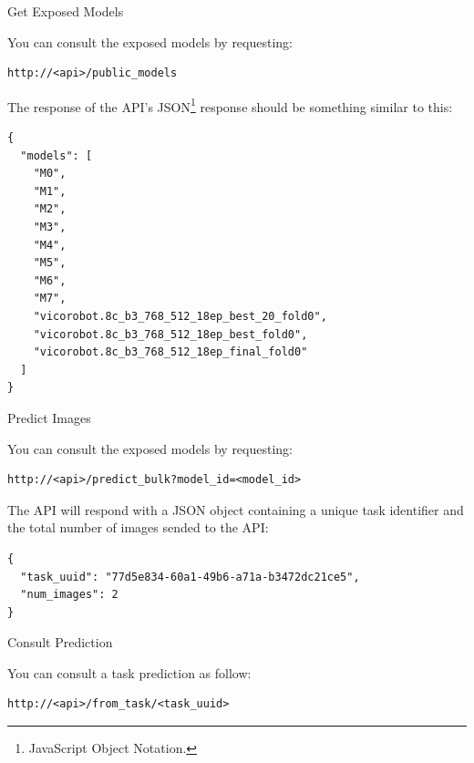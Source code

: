 \documentclass[dvipsnames,mathserif]{beamer}
\begin{document}
{    \begin{frame}[fragile]
      \large Get Exposed Models

      \vspace{0.25cm}
      \footnotesize
You can consult the exposed models by requesting:

      \begin{Verbatim}[fontsize=\scriptsize]
http://<api>/public_models
      \end{Verbatim}

      The response of the API's JSON\footnote{JavaScript Object Notation.} response should be something similar to this:

\begin{Verbatim}[fontsize=\scriptsize]
{
  "models": [
    "M0",
    "M1",
    "M2",
    "M3",
    "M4",
    "M5",
    "M6",
    "M7",
    "vicorobot.8c_b3_768_512_18ep_best_20_fold0",
    "vicorobot.8c_b3_768_512_18ep_best_fold0",
    "vicorobot.8c_b3_768_512_18ep_final_fold0"
  ]
}
\end{Verbatim}

    \end{frame}


    \begin{frame}[fragile]
      \large Predict Images

      \vspace{0.25cm}
      \footnotesize
You can consult the exposed models by requesting:

      \begin{Verbatim}[fontsize=\scriptsize]
http://<api>/predict_bulk?model_id=<model_id>
      \end{Verbatim}
The API will respond with a JSON object containing a unique task identifier and
the total number of images sended to the API:


\begin{Verbatim}[fontsize=\scriptsize]
{
  "task_uuid": "77d5e834-60a1-49b6-a71a-b3472dc21ce5",
  "num_images": 2
}
\end{Verbatim}

    \end{frame}

    \begin{frame}[fragile]
      \large Consult Prediction

      \vspace{0.25cm}
      \footnotesize
  You can consult a task prediction as follow:

\begin{Verbatim}[fontsize=\scriptsize]
http://<api>/from_task/<task_uuid>
\end{Verbatim}


\end{frame}}
\end{document}
